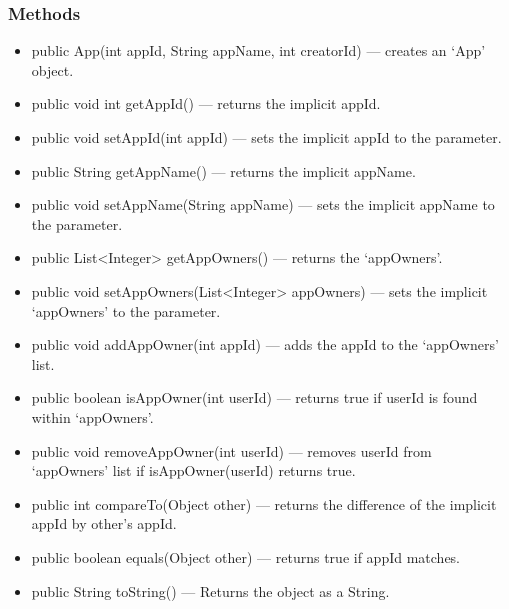 \documentclass{article}
\begin{document}
\subsubsection{Methods}
\begin{itemize}
    \item{public App(int appId, String appName, int creatorId)}
        --- creates an `App' object.
    \item{public void int getAppId()}
        --- returns the implicit appId.
    \item{public void setAppId(int appId)}
        --- sets the implicit appId to the parameter.
    \item{public String getAppName()}
        --- returns the implicit appName.
    \item{public void setAppName(String appName)}
        --- sets the implicit appName to the parameter.
    \item{public List<Integer> getAppOwners()}
        --- returns the `appOwners'.
    \item{public void setAppOwners(List<Integer> appOwners)}
        --- sets the implicit `appOwners' to the parameter.
    \item{public void addAppOwner(int appId)}
        --- adds the appId to the `appOwners' list.
    \item{public boolean isAppOwner(int userId)}
        --- returns true if userId is found within `appOwners'.
    \item{public void removeAppOwner(int userId)}
        --- removes userId from `appOwners' list if isAppOwner(userId) returns true.
    \item{public int compareTo(Object other)}
        --- returns the difference of the implicit appId by other's appId.
    \item{public boolean equals(Object other)}
        --- returns true if appId matches.
    \item{public String toString()}
        --- Returns the object as a String.
\end{itemize}
\end{document}

